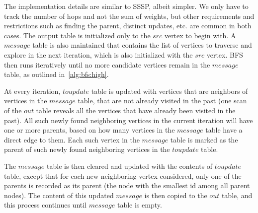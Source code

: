 The implementation details are similar to SSSP, albeit simpler. We only have to
track the number of hops and not the sum of weights, but other requirements and
restrictions such as finding the parent, distinct updates, etc. are common in
both cases. The output table is initialized only to the $src$ vertex to begin
with. A $message$ table is also maintained that contains the list of vertices
to traverse and explore in the next iteration, which is also initialized with
the $src$ vertex. BFS then runs iteratively until no more candidate vertices
remain in the $message$ table, as outlined in~\ref{alg:bfs:high}.

At every iteration, $toupdate$ table is updated with vertices that are neighbors
of vertices in the $message$ table, that are not already visited in the past
(one scan of the $out$ table reveals all the vertices that have already been
visited in the past). All such newly found neighboring vertices in the current
iteration will have one or more parents, based on how many vertices in the
$message$ table have a direct edge to them. Each such vertex in the $message$
table is marked as the parent of such newly found neighboring vertices in
the $toupdate$ table.

The $message$ table is then cleared and updated with the contents of $toupdate$
table, except that for each new neighboring vertex considered, only one of the
parents is recorded as its parent (the node with the smallest id among all
parent nodes). The content of this updated $message$ is then copied
to the $out$ table, and this process continues until $message$ table is empty.
